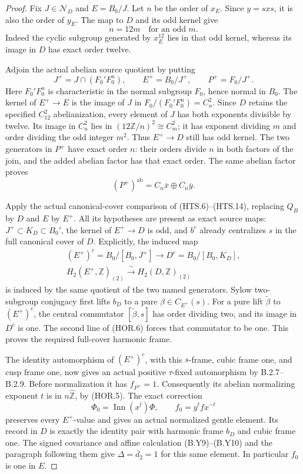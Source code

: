 \begin{proof}
Fix $J\in\mathcal N_D$ and $E=B_0/J$.
Let $n$ be the order of $x_E$.  Since $y=sxs$, it
is also the order of $y_E$.  The map to $D$ and its
odd kernel give
\[
                      n=12m\quad\text{for an odd }m.
 \tag{HOR.3}
\]
Indeed the cyclic subgroup generated by $x_E^{12}$
lies in that odd kernel, whereas its image in $D$
has exact order twelve.

Adjoin the actual abelian source quotient by putting
\[
 J^+=J\cap(F_0'F_0^n),\qquad
 E^+=B_0/J^+,\qquad P^+=F_0/J^+.
 \tag{HOR.4}
\]
Here $F_0'F_0^n$ is characteristic in the normal
subgroup $F_0$, hence normal in $B_0$.
The kernel of $E^+\to E$ is the image of $J$ in
$F_0/(F_0'F_0^n)=C_n^2$.
Since $D$ retains the specified $C_{12}^2$
abelianization, every element of $J$ has both
exponents divisible by twelve.  Its image in
$C_n^2$ lies in $(12\mathbb Z/n)^2\cong C_m^2$;
it has exponent dividing $m$ and order dividing
the odd integer $m^2$.  Thus $E^+\to D$ still has odd kernel.
The two generators in $P^+$ have exact order $n$:
their orders divide $n$ in both factors of the
join, and the added abelian factor has that exact
order.  The same abelian factor proves
\[
               (P^+)^{\mathrm{ab}}
                       =C_n\overline x\oplus C_n\overline y.
 \tag{HOR.5}
\]

Apply the actual canonical-cover comparison of
(HTS.6)--(HTS.14), replacing $Q_B$ by $D$ and $E$
by $E^+$.  All its hypotheses are present as exact
source maps: $J^+\subset K_D\subset B_0'$,
the kernel of $E^+\to D$ is odd, and $b^c$
already centralizes $s$ in the full canonical
cover of $D$.  Explicitly, the induced map
\[
 \begin{gathered}
 (E^+)^c=B_0/[B_0,J^+]
      \longrightarrow D^c=B_0/[B_0,K_D],\\
 H_2(E^+,\mathbb Z)_{(2)}
          \xrightarrow{\ \sim\ }H_2(D,\mathbb Z)_{(2)}
 \end{gathered}                                        \tag{HOR.6}
\]
is induced by the same quotient of the two named
generators.  Sylow two-subgroup conjugacy first
lifts $b_D$ to a pure $\beta\in C_{E^+}(s)$.
For a pure lift $\widetilde\beta$ to $(E^+)^c$,
the central commutator $[\widetilde\beta,s]$ has
order dividing two, and its image in $D^c$ is one.
The second line of (HOR.6) forces that commutator
to be one.  This proves the required full-cover
harmonic frame.

The identity automorphism of $(E^+)^c$, with this
$s$-frame, cubic frame one, and cusp frame one,
now gives an actual positive $\tau$-fixed
automorphism by B.2.7--B.2.9.  Before normalization
it has $f_{P^+}=1$.  Consequently its abelian
normalizing exponent $t$ is in
$n\widehat{\mathbb Z}$, by (HOR.5).
The exact correction
\[
       \Phi_0=\operatorname{Inn}(x^t)\Phi,
       \qquad f_0=y^t f x^{-t}
 \tag{HOR.7}
\]
preserves every $E^+$-value and gives an actual
normalized gentle element.  Its record in $D$
is exactly the identity pair with harmonic frame
$b_D$ and cubic frame one.  The signed covariance
and affine calculation (B.Y9)--(B.Y10) and the
paragraph following them give
$\Delta=\overline d_2=1$ for this same element.
In particular $f_0$ is one in $E$.


\end{proof}
